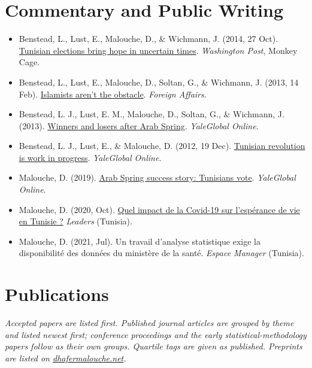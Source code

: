 \documentclass[10pt,a4paper]{article}
\begin{document}
\section{Commentary and Public Writing}
\begin{itemize}
\item Benstead, L., Lust, E., Malouche, D., \& Wichmann, J. (2014, 27 Oct).
      \href{https://www.washingtonpost.com/news/monkey-cage/wp/2014/10/27/tunisian-elections-bring-hope-in-uncertain-times/}{Tunisian elections bring hope in uncertain times}. \emph{Washington Post}, Monkey Cage.
\item Benstead, L., Lust, E., Malouche, D., Soltan, G., \& Wichmann, J. (2013, 14 Feb).
      \href{https://www.foreignaffairs.com/tunisia/islamists-arent-obstacle}{Islamists aren't the obstacle}. \emph{Foreign Affairs}.
\item Benstead, L. J., Lust, E. M., Malouche, D., Soltan, G., \& Wichmann, J. (2013).
      \href{https://archive-yaleglobal.yale.edu/content/winners-and-losers-after-arab-spring}{Winners and losers after Arab Spring}. \emph{YaleGlobal Online}.
\item Benstead, L. J., Lust, E., \& Malouche, D. (2012, 19 Dec).
      \href{https://archive-yaleglobal.yale.edu/content/tunisian-revolution-work-progress}{Tunisian revolution is work in progress}. \emph{YaleGlobal Online}.
\item Malouche, D. (2019). \href{https://archive-yaleglobal.yale.edu/content/arab-spring-success-story-tunisians-vote}{Arab Spring success story: Tunisians vote}. \emph{YaleGlobal Online}.
\item Malouche, D. (2020, Oct). \href{https://leaders.com.tn/article/30775-dhafer-malouche-quel-impact-de-la-covid-19-sur-l-esperance-de-vie-en-tunisie}{Quel impact de la Covid-19 sur l'esp\'erance de vie en Tunisie ?} \emph{Leaders} (Tunisia).
\item Malouche, D. (2021, Jul). Un travail d'analyse statistique exige la disponibilit\'e des donn\'ees du minist\`ere de la sant\'e. \emph{Espace Manager} (Tunisia).
\end{itemize}

\section{Publications}
\textit{Accepted papers are listed first. Published journal articles are grouped by theme and listed newest first;
conference proceedings and the early statistical-methodology papers follow as their own groups. Quartile tags are given as published. Preprints are listed on
\href{https://dhafermalouche.net}{dhafermalouche.net}.}
\end{document}
